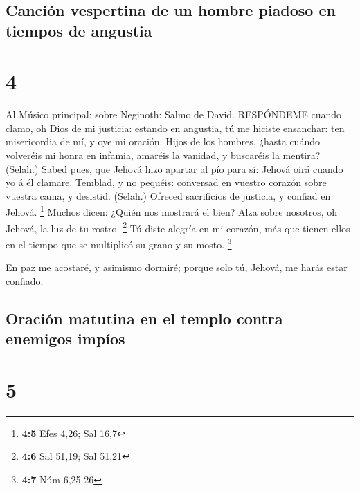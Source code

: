 \hypertarget{canciuxf3n-vespertina-de-un-hombre-piadoso-en-tiempos-de-angustia}{%
\subsection{Canción vespertina de un hombre piadoso en tiempos de
angustia}\label{canciuxf3n-vespertina-de-un-hombre-piadoso-en-tiempos-de-angustia}}

\hypertarget{section-3}{%
\section{4}\label{section-3}}

 Al Músico principal: sobre Neginoth: Salmo de David.
RESPÓNDEME cuando clamo, oh Dios de mi justicia: estando en angustia, tú
me hiciste ensanchar: ten misericordia de mí, y oye mi oración.
 Hijos de los hombres, ¿hasta cuándo volveréis mi honra en
infamia, amaréis la vanidad, y buscaréis la mentira? (Selah.)
 Sabed pues, que Jehová hizo apartar al pío para sí: Jehová
oirá cuando yo á él clamare.  Temblad, y no pequéis:
conversad en vuestro corazón sobre vuestra cama, y desistid. (Selah.)
 Ofreced sacrificios de justicia, y confiad en Jehová.
\footnote{\textbf{4:5} Efes 4,26; Sal 16,7}  Muchos dicen:
¿Quién nos mostrará el bien? Alza sobre nosotros, oh Jehová, la luz de
tu rostro. \footnote{\textbf{4:6} Sal 51,19; Sal 51,21}  Tú
diste alegría en mi corazón, más que tienen ellos en el tiempo que se
multiplicó su grano y su mosto. \footnote{\textbf{4:7} Núm 6,25-26}

 En paz me acostaré, y asimismo dormiré; porque solo tú,
Jehová, me harás estar confiado.

\hypertarget{oraciuxf3n-matutina-en-el-templo-contra-enemigos-impuxedos}{%
\subsection{Oración matutina en el templo contra enemigos
impíos}\label{oraciuxf3n-matutina-en-el-templo-contra-enemigos-impuxedos}}

\hypertarget{section-4}{%
\section{5}\label{section-4}}

